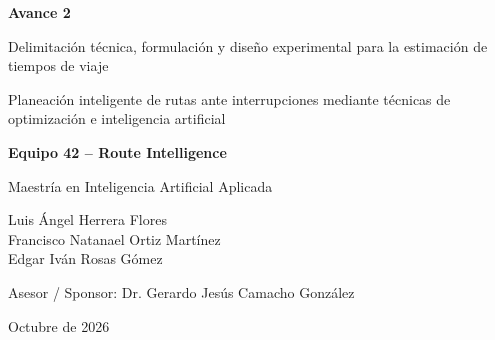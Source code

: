 \documentclass[11pt]{article}
\begin{document}
\begin{titlepage}
    \centering

    \vspace*{2.0cm}

    {\large\bfseries
    Avance 2
    \par}

    \vspace{0.6cm}

    {\LARGE\bfseries
    \parbox{0.88\textwidth}{
        \centering
        Delimitación técnica, formulación y diseño experimental
        para la estimación de tiempos de viaje
    }
    \par}

    \vspace{1.2cm}

    {\large
    \parbox{0.88\textwidth}{
        \centering
        Planeación inteligente de rutas ante interrupciones mediante técnicas de optimización e inteligencia artificial
    }
    \par}

    \vspace{1.5cm}

    {\large\bfseries
    Equipo 42 -- Route Intelligence
    \par}

    \vspace{0.35cm}

    {\normalsize
    Maestría en Inteligencia Artificial Aplicada
    \par}

    \vspace{1.5cm}

    {\normalsize
    Luis Ángel Herrera Flores\\[0.25cm]
    Francisco Natanael Ortiz Martínez\\[0.25cm]
    Edgar Iván Rosas Gómez
    \par}

    \vspace{1.2cm}

    {\normalsize
    Asesor / Sponsor: Dr. Gerardo Jesús Camacho González
    \par}

    \vfill

    {\normalsize
    Octubre de 2026
    \par}

\end{titlepage}
\end{document}
